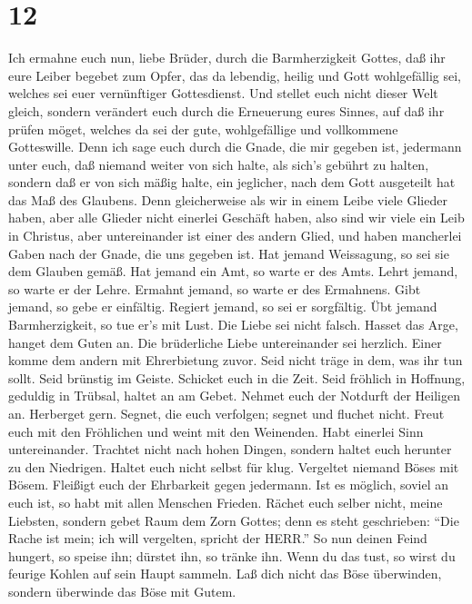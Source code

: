 \hypertarget{section-11}{%
\section{12}\label{section-11}}

 Ich ermahne euch nun, liebe Brüder, durch die
Barmherzigkeit Gottes, daß ihr eure Leiber begebet zum Opfer, das da
lebendig, heilig und Gott wohlgefällig sei, welches sei euer
vernünftiger Gottesdienst.  Und stellet euch nicht dieser
Welt gleich, sondern verändert euch durch die Erneuerung eures Sinnes,
auf daß ihr prüfen möget, welches da sei der gute, wohlgefällige und
vollkommene Gotteswille.  Denn ich sage euch durch die
Gnade, die mir gegeben ist, jedermann unter euch, daß niemand weiter von
sich halte, als sich's gebührt zu halten, sondern daß er von sich mäßig
halte, ein jeglicher, nach dem Gott ausgeteilt hat das Maß des Glaubens.
 Denn gleicherweise als wir in einem Leibe viele Glieder
haben, aber alle Glieder nicht einerlei Geschäft haben, 
also sind wir viele ein Leib in Christus, aber untereinander ist einer
des andern Glied,  und haben mancherlei Gaben nach der
Gnade, die uns gegeben ist.  Hat jemand Weissagung, so sei
sie dem Glauben gemäß. Hat jemand ein Amt, so warte er des Amts. Lehrt
jemand, so warte er der Lehre.  Ermahnt jemand, so warte er
des Ermahnens. Gibt jemand, so gebe er einfältig. Regiert jemand, so sei
er sorgfältig. Übt jemand Barmherzigkeit, so tue er's mit Lust.
 Die Liebe sei nicht falsch. Hasset das Arge, hanget dem
Guten an.  Die brüderliche Liebe untereinander sei
herzlich. Einer komme dem andern mit Ehrerbietung zuvor. 
Seid nicht träge in dem, was ihr tun sollt. Seid brünstig im Geiste.
Schicket euch in die Zeit.  Seid fröhlich in Hoffnung,
geduldig in Trübsal, haltet an am Gebet.  Nehmet euch der
Notdurft der Heiligen an. Herberget gern.  Segnet, die euch
verfolgen; segnet und fluchet nicht.  Freut euch mit den
Fröhlichen und weint mit den Weinenden.  Habt einerlei Sinn
untereinander. Trachtet nicht nach hohen Dingen, sondern haltet euch
herunter zu den Niedrigen.  Haltet euch nicht selbst für
klug. Vergeltet niemand Böses mit Bösem. Fleißigt euch der Ehrbarkeit
gegen jedermann.  Ist es möglich, soviel an euch ist, so
habt mit allen Menschen Frieden.  Rächet euch selber nicht,
meine Liebsten, sondern gebet Raum dem Zorn Gottes; denn es steht
geschrieben: ``Die Rache ist mein; ich will vergelten, spricht der
HERR.''  So nun deinen Feind hungert, so speise ihn;
dürstet ihn, so tränke ihn. Wenn du das tust, so wirst du feurige Kohlen
auf sein Haupt sammeln.  Laß dich nicht das Böse
überwinden, sondern überwinde das Böse mit Gutem.

